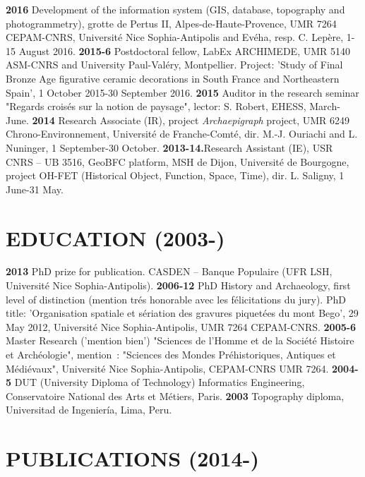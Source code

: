 \documentclass{article}
\begin{document}
\smallbreak
\textbf{2016 }Development of the information system (GIS, database, topography and photogrammetry), grotte de Pertus II, Alpes-de-Haute-Provence, UMR 7264 CEPAM-CNRS, Universit\'{e} Nice Sophia-Antipolis and Ev\'{e}ha, resp. C. Lep\`{e}re, 1-15 August 2016.
\smallbreak
\textbf{2015-6 }Postdoctoral fellow, LabEx ARCHIMEDE, UMR 5140 ASM-CNRS and University Paul-Val\'{e}ry, Montpellier. Project: 'Study of Final Bronze Age figurative ceramic decorations in South France and Northeastern Spain', 1 October 2015-30 September 2016.
\smallbreak
\textbf{2015 }Auditor in the research seminar "Regards crois\'{e}s sur la notion de paysage", lector: S. Robert, EHESS, March-June.\textbf{}
\smallbreak
\textbf{2014 }Research\textbf{ }Associate (IR), project \textit{Archaepigraph} project, UMR 6249 Chrono-Environnement, Universit\'{e} de Franche-Comt\'{e}, dir. M.-J. Ouriachi and L. Nuninger, 1 September-30 October.
\smallbreak
\textbf{2013-14.}Research Assistant (IE), USR CNRS -- UB 3516, GeoBFC platform, MSH de Dijon, Universit\'{e} de Bourgogne, project OH-FET (Historical Object, Function, Space, Time), dir. L. Saligny, 1 June-31 May.

\section{EDUCATION (2003-)}

\textbf{2013 }PhD prize for publication. CASDEN -- Banque Populaire (UFR LSH, Universit\'{e} Nice Sophia-Antipolis).
\smallbreak
\textbf{2006-12 }PhD History and Archaeology, first level of distinction (mention tr\'{e}s honorable avec les f\'{e}licitations du jury). PhD title: 'Organisation spatiale et s\'{e}riation des gravures piquet\'{e}es du mont Bego', 29 May 2012, Universit\'{e} Nice Sophia-Antipolis, UMR 7264 CEPAM-CNRS.
\smallbreak
\textbf{2005-6 }Master Research ('mention bien') "Sciences de l'Homme et de la Soci\'{e}t\'{e} Histoire et Arch\'{e}ologie", mention~: "Sciences des Mondes Pr\'{e}historiques, Antiques et M\'{e}di\'{e}vaux", Universit\'{e} Nice Sophia-Antipolis, CEPAM-CNRS UMR 7264.
\smallbreak
\textbf{2004-5 }DUT (University Diploma of Technology) Informatics Engineering, Conservatoire National des Arts et M\'{e}tiers, Paris.
\smallbreak
\textbf{2003 } Topography diploma, Universitad de Ingenier\'{i}a, Lima, Peru.

\section{PUBLICATIONS (2014-)}
\end{document}
